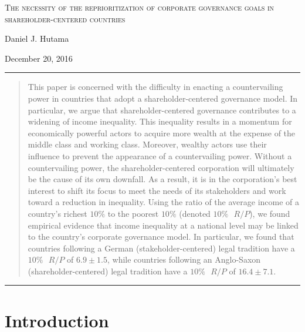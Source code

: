 \documentclass[12pt]{article}
\begin{document}
 
	
\begin{titlepage} 
\thispagestyle{empty}
	\begin{center}
\Large
\textsc{The necessity of the reprioritization  of corporate governance goals in shareholder-centered countries}
		\large
		\vspace{1cm}
		
		Daniel J. Hutama
		\vspace{0.5 cm}
		
		December 20, 2016
        
        \vspace{0.5 cm}
	\end{center}
		\hrule
	\begin{abstract} 
This paper is concerned with the difficulty in enacting a countervailing power in countries that adopt a shareholder-centered governance model. In particular, we argue that shareholder-centered governance contributes to a widening of income inequality. This inequality results in a momentum for economically powerful actors to acquire more wealth at the expense of the middle class and working class. Moreover, wealthy actors use their influence to prevent the appearance of a countervailing power. Without a countervailing power, the shareholder-centered corporation will ultimately be the cause of its own downfall. As a result, it is in the corporation's best interest to shift its focus to meet the needs of its stakeholders and work toward a reduction in inequality. Using the ratio of the average income of a country's richest $10\%$ to the poorest $10\%$ (denoted $10\% \text{ } R/P$), we found empirical evidence that income inequality at a national level may be linked to the country's corporate governance model. In particular, we found that countries following a German (stakeholder-centered) legal tradition have a $10\% \text{ } R/P$ of $6.9 \pm 1.5$, while countries following an Anglo-Saxon (shareholder-centered) legal tradition have a $10\% \text{ } R/P$ of $16.4 \pm 7.1$.


\end{abstract}
\hrule
\end{titlepage}
\setcounter{page}{1}

\section{\large Introduction}\label{sec:introduction}
\end{document}
